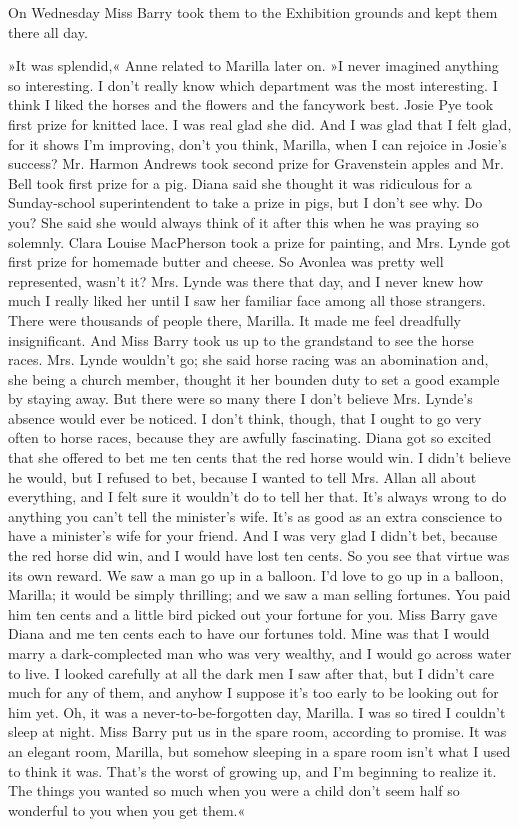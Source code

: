 On Wednesday Miss Barry took them to the Exhibition grounds and kept them there all day.

»It was splendid,« Anne related to Marilla later on. »I never imagined anything so interesting. I don’t really know which department was the most interesting. I think I liked the horses and the flowers and the fancywork best. Josie Pye took first prize for knitted lace. I was real glad she did. And I was glad that I felt glad, for it shows I’m improving, don’t you think, Marilla, when I can rejoice in Josie’s success? Mr. Harmon Andrews took second prize for Gravenstein apples and Mr. Bell took first prize for a pig. Diana said she thought it was ridiculous for a Sunday-school superintendent to take a prize in pigs, but I don’t see why. Do you? She said she would always think of it after this when he was praying so solemnly. Clara Louise MacPherson took a prize for painting, and Mrs. Lynde got first prize for homemade butter and cheese. So Avonlea was pretty well represented, wasn’t it? Mrs. Lynde was there that day, and I never knew how much I really liked her until I saw her familiar face among all those strangers. There were thousands of people there, Marilla. It made me feel dreadfully insignificant. And Miss Barry took us up to the grandstand to see the horse races. Mrs. Lynde wouldn’t go; she said horse racing was an abomination and, she being a church member, thought it her bounden duty to set a good example by staying away. But there were so many there I don’t believe Mrs. Lynde’s absence would ever be noticed. I don’t think, though, that I ought to go very often to horse races, because they are awfully fascinating. Diana got so excited that she offered to bet me ten cents that the red horse would win. I didn’t believe he would, but I refused to bet, because I wanted to tell Mrs. Allan all about everything, and I felt sure it wouldn’t do to tell her that. It’s always wrong to do anything you can’t tell the minister’s wife. It’s as good as an extra conscience to have a minister’s wife for your friend. And I was very glad I didn’t bet, because the red horse did win, and I would have lost ten cents. So you see that virtue was its own reward. We saw a man go up in a balloon. I’d love to go up in a balloon, Marilla; it would be simply thrilling; and we saw a man selling fortunes. You paid him ten cents and a little bird picked out your fortune for you. Miss Barry gave Diana and me ten cents each to have our fortunes told. Mine was that I would marry a dark-complected man who was very wealthy, and I would go across water to live. I looked carefully at all the dark men I saw after that, but I didn’t care much for any of them, and anyhow I suppose it’s too early to be looking out for him yet. Oh, it was a never-to-be-forgotten day, Marilla. I was so tired I couldn’t sleep at night. Miss Barry put us in the spare room, according to promise. It was an elegant room, Marilla, but somehow sleeping in a spare room isn’t what I used to think it was. That’s the worst of growing up, and I’m beginning to realize it. The things you wanted so much when you were a child don’t seem half so wonderful to you when you get them.«

